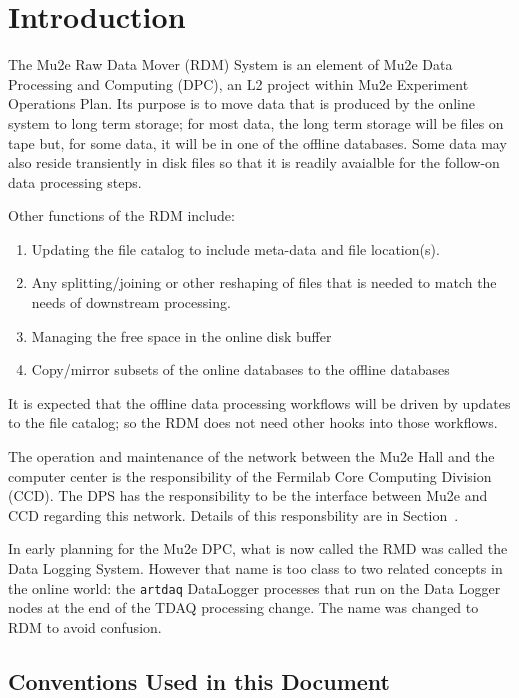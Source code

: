 \chapter{Introduction}

\label{ch:intro}

The Mu2e Raw Data Mover (RDM) System is an element of Mu2e Data Processing
and Computing (DPC), an L2 project within Mu2e Experiment Operations Plan.
Its purpose is to move data
that is produced by the online system to long term storage;
for most data, the long term storage will be files on tape
but, for some data, it will be in one of the offline databases.
Some data may also reside transiently in disk files so that
it is readily avaialble for the follow-on data processing steps.

Other functions of the RDM include:
\begin{enumerate}
\item Updating the file catalog to include meta-data and file location(s).
\item Any splitting/joining or other reshaping of files that is needed to match the needs of downstream processing.
\item Managing the free space in the online disk buffer
\item Copy/mirror subsets of the online databases to the offline databases
\end{enumerate}

It is expected that the offline data processing workflows will be driven by updates to the file catalog;
so the RDM does not need other hooks into those workflows.

The operation and maintenance of the network between the Mu2e Hall and the computer center
is the responsibility of the Fermilab Core Computing Division (CCD).
The DPS has the responsibility to be the interface between Mu2e and CCD regarding this network.
Details of this responsbility are in Section~.

In early planning for the Mu2e DPC, what is now called the RMD was called the Data Logging System.
However that name is too class to two related concepts in the online world:
the {\tt artdaq} DataLogger processes that run on the Data Logger nodes at the end of the TDAQ
processing change.  The name was changed to RDM to avoid confusion.

\section{Conventions Used in this Document}

